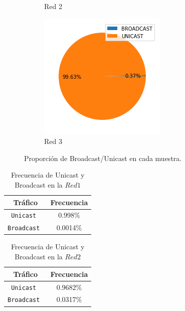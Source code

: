\begin{figure}[H]
\begin{subfigure}[b]{0.3\textwidth}
        \caption{Red 2}
        \label{fig: b/u red 2}
    \end{subfigure}
    \begin{subfigure}[b]{0.3\textwidth} 
        \centering
        \includegraphics[width=\textwidth]{images/resultados_lion/red_3_broadcast_unicast.png}
        \caption{Red 3}
        \label{fig: b/u red 3}
    \end{subfigure}
    \caption{Proporción de Broadcast/Unicast en cada muestra.}
    \label{fig: informacion de los simbolos}
\end{figure}

\begin{table}[H]\begin{center}
  \begin{tabular}{|c|c|}
  \hline
  \textbf{Tráfico} & \textbf{Frecuencia} \\ \hline
  \texttt{Unicast   }&  0.998\%     \\ \hline
  \texttt{Broadcast      }&  0.0014\%     \\ \hline
  \end{tabular}
  \caption{Frecuencia de Unicast y Broadcast en la $Red 1$}
  \label{Red 1}
\end{center}\end{table}

\begin{table}[H]\begin{center}
  \begin{tabular}{|c|c|}
  \hline
  \textbf{Tráfico} & \textbf{Frecuencia} \\ \hline
  \texttt{Unicast   }&  0.9682\%     \\ \hline
  \texttt{Broadcast      }&  0.0317\%     \\ \hline
  \end{tabular}
  \caption{Frecuencia de Unicast y Broadcast en la $Red 2$}
  \label{Red 2}
\end{center}\end{table}

